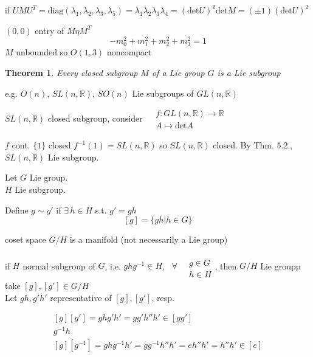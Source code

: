 \documentclass[twoside]{amsart}
\newtheorem{theorem}{Theorem}
\begin{document}
if $UMU^T = \text{diag}{ ( \lambda_1, \lambda_2, \lambda_3, \lambda_5) } = \lambda_1 \lambda_2 \lambda_3 \lambda_4 = (\text{det}{U})^2 \text{det}{M} = (\pm 1) (\text{det}{U} )^2$

$(0,0)$ entry of $M\eta M^T$
\[
-m_0^2 + m_1^2 + m_2^2 + m_3^2 = 1 
\]$M$ unbounded so $O(1,3)$ noncompact

\begin{theorem}{5.2} Every closed subgroup $M$ of a Lie group $G$ is a Lie subgroup
\end{theorem}

e.g. $O(n)$, $SL(n,\mathbb{R})$, $SO(n)$ Lie subgroups of $GL(n,\mathbb{R})$

$SL(n,\mathbb{R})$ closed subgroup, consider $ \begin{aligned} & f: GL(n, \mathbb{R}) \to \mathbb{R} \\ 
  & A \mapsto \text{det}{A} \end{aligned}$

$f$ cont. $\lbrace 1 \rbrace$ closed $f^{-1}(1) = SL(n,\mathbb{R})$ so $SL(n,\mathbb{R})$ closed.  By Thm. 5.2., $SL(n, \mathbb{R}) $ Lie subgroup. 

Let $G$ Lie group. \\
\phantom{Let } $H$ Lie subgroup.

Define $g\sim g'$ if $\exists \, h \in H$ s.t. $g' = gh$ 
\[
[g] = \lbrace gh | h \in G \rbrace
\]

coset space $G /H$ is a manifold (not necessarily a Lie group)

if $H$ normal subgroup of $G$, i.e. $ghg^{-1} \in H$, \, $\forall \, \begin{aligned} & \\ 
  & g \in G \\
  & h \in H \end{aligned}$, then $G/H$ Lie groupp \\

take $[g], [g'] \in G/H$ \\
Let $gh, g'h'$ representative of $[g], [g']$, resp. 

\[
\begin{gathered}
  [g][g'] = gh g'h' = gg' h'' h' \in [gg'] \\ 
  g^{-1} h \\
  [g][g^{-1} ] = gh g^{-1} h' = gg^{-1} h'' h' = e h'' h' = h'' h' \in [e]
\end{gathered}
\]
\end{document}
